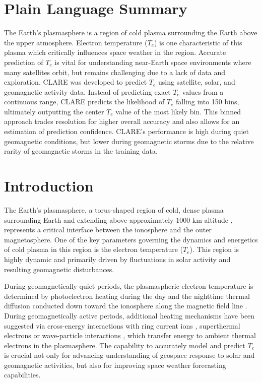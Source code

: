 \documentclass{agujournal2019}
\begin{document}
\section*{Plain Language Summary}
\label{plain_language_summary}
The Earth's plasmasphere is a region of cold plasma surrounding the Earth above the upper atmosphere. Electron temperature ($T_e$) is one characteristic of this plasma which critically influences space weather in the region. Accurate prediction of $T_e$ is vital for understanding near-Earth space environments where many satellites orbit, but remains challenging due to a lack of data and exploration. CLARE was developed to predict $T_e$ using satellite, solar, and geomagnetic activity data. Instead of predicting exact $T_e$ values from a continuous range, CLARE predicts the likelihood of $T_e$ falling into 150 bins, ultimately outputting the center $T_e$ value of the most likely bin. This binned approach trades resolution for higher overall accuracy and also allows for an estimation of prediction confidence. CLARE's performance is high during quiet geomagnetic conditions, but lower during geomagnetic storms due to the relative rarity of geomagnetic storms in the training data.


\section{Introduction}
\label{introduction}
The Earth's plasmasphere, a torus-shaped region of cold, dense plasma surrounding Earth and extending above approximately 1000 km altitude \citep{goldstein_plasmasphere_2006}, represents a critical interface between the ionosphere and the outer magnetosphere. One of the key parameters governing the dynamics and energetics of cold plasma in this region is the electron temperature ($T_e$). This region is highly dynamic and primarily driven by fluctuations in solar activity and resulting geomagnetic disturbances.

During geomagnetically quiet periods, the plasmaspheric electron temperature is determined by photoelectron heating during the day and the nighttime thermal diffusion conducted down toward the ionosphere along the magnetic field line \citep{balan_plasmasphere_1996}.
During geomagnetically active periods, additional heating mechanisms have been suggested via cross-energy interactions with ring current ions \citep{ferradas_effects_2023}, superthermal electrons \citep{khazanov_inertia_2024} or wave-particle interactions \citep{usanova_role_2025}, which transfer energy to ambient thermal electrons in the plasmasphere. 
The capability to accurately model and predict $T_e$ is crucial not only for advancing understanding of geospace response to solar and geomagnetic activities, but also for improving space weather forecasting capabilities.
\end{document}
